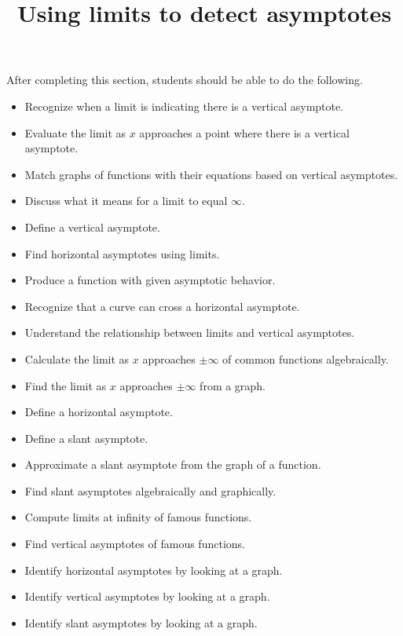 \documentclass{ximera}
\title{Using limits to detect asymptotes}
\begin{document}
\begin{abstract}
\end{abstract}

\maketitle

\begin{sectionOutcomes}

After completing this section, students should be able to do the following.

\begin{itemize}
\item Recognize when a limit is indicating there is a vertical asymptote.
\item Evaluate the limit as $x$ approaches a point where there is a vertical asymptote.
\item Match graphs of functions with their equations based on vertical asymptotes.
\item Discuss what it means for a limit to equal $\infty$.
\item Define a vertical asymptote.
\item Find horizontal asymptotes using limits.
\item Produce a function with given asymptotic behavior.
\item Recognize that a curve can cross a horizontal asymptote.
\item Understand the relationship between limits and vertical asymptotes.
\item Calculate the limit as $x$ approaches $\pm \infty$ of common functions algebraically.
\item Find the limit as $x$ approaches $\pm \infty$ from a graph.
\item Define a horizontal asymptote.
\item Define a slant asymptote.
\item Approximate a slant asymptote from the graph of a function.
\item Find slant asymptotes algebraically and graphically.
\item Compute limits at infinity of famous functions.
\item Find vertical asymptotes of famous functions.
\item Identify horizontal asymptotes by looking at a graph.
\item Identify vertical asymptotes by looking at a graph.
\item Identify slant asymptotes by looking at a graph.
\end{itemize}
\end{sectionOutcomes}
\end{document}
